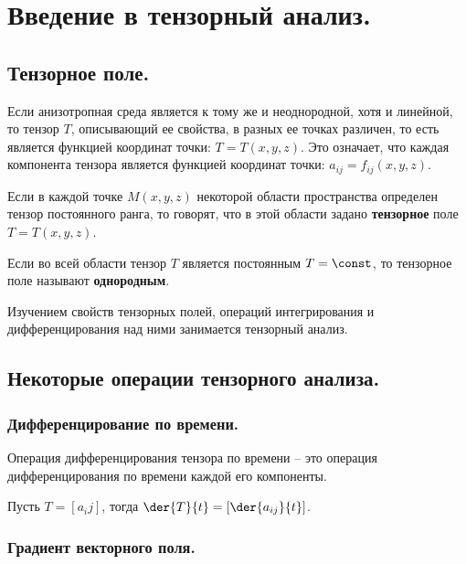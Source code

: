 \section{Введение в тензорный анализ.}

\subsection{Тензорное поле.}

	Если анизотропная среда является к тому же и неоднородной, хотя и линейной, то тензор \( T \), описывающий ее свойства, в разных ее точках различен, то есть является функцией координат точки: \( T = T(x, y, z) \). Это означает, что каждая компонента тензора является функцией координат точки: \( a_{ij} = f_{ij}(x, y, z) \).
	
	\begin{definition}
	
	Если в каждой точке \( M(x, y, z) \) некоторой области пространства определен тензор постоянного ранга, то говорят, что в этой области задано \textbf{тензорное} поле \( T = T(x, y, z) \).
	\end{definition}
	
	\begin{definition}
	
	Если во всей области тензор \( T \) является постоянным \( T = \const \), то тензорное поле называют \textbf{однородным}.
	\end{definition}
	
	Изучением свойств тензорных полей, операций интегрирования и дифференцирования над ними занимается тензорный анализ. 

\subsection{Некоторые операции тензорного анализа.}

\subsubsection{Дифференцирование по времени.}

	Операция дифференцирования тензора по времени -- это операция дифференцирования по времени каждой его компоненты.
	
	Пусть \( T = [a_ij] \), тогда \( \der{T}{t} = \left[\der{a_{ij}}{t}\right] \).

\subsubsection{Градиент векторного поля.}

